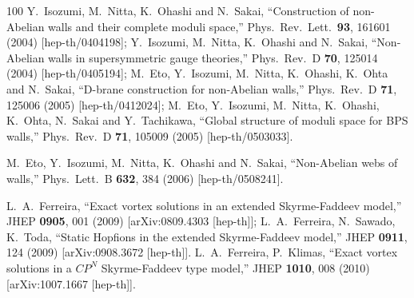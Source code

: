 \documentclass[aps,prd,preprint,
superscriptaddress]{revtex4}
\newcommand {\1}[1]{\frac{1}{#1}}
\newcommand {\2}[1]{\frac{i}{#1}}
\begin{document}
\begin{thebibliography}{100}
  Y.~Isozumi, M.~Nitta, K.~Ohashi and N.~Sakai,
  ``Construction of non-Abelian walls and their complete moduli space,''  
Phys.\ Rev.\ Lett.\  {\bf 93}, 161601 (2004)  [hep-th/0404198];  %
  Y.~Isozumi, M.~Nitta, K.~Ohashi and N.~Sakai,
  ``Non-Abelian walls in supersymmetric gauge theories,''  
Phys.\ Rev.\ D {\bf 70}, 125014 (2004)  [hep-th/0405194];  %
  M.~Eto, Y.~Isozumi, M.~Nitta, K.~Ohashi, K.~Ohta and N.~Sakai,
  ``D-brane construction for non-Abelian walls,''  
Phys.\ Rev.\ D {\bf 71}, 125006 (2005)  [hep-th/0412024];  %
  M.~Eto, Y.~Isozumi, M.~Nitta, K.~Ohashi, K.~Ohta, N.~Sakai and Y.~Tachikawa,
  ``Global structure of moduli space for BPS walls,''  Phys.\ Rev.\ D {\bf 71}, 105009 (2005)  [hep-th/0503033].  %

  M.~Eto, Y.~Isozumi, M.~Nitta, K.~Ohashi and N.~Sakai,
  ``Non-Abelian webs of walls,''  Phys.\ Lett.\ B {\bf 632}, 384 (2006)  [hep-th/0508241]. %

  L.~A.~Ferreira,
  ``Exact vortex solutions in an extended Skyrme-Faddeev model,''
  JHEP {\bf 0905}, 001 (2009) [arXiv:0809.4303 [hep-th]];
  L.~A.~Ferreira, N.~Sawado, K.~Toda,
  ``Static Hopfions in the extended Skyrme-Faddeev model,''
  JHEP {\bf 0911}, 124 (2009)
  [arXiv:0908.3672 [hep-th]].
  L.~A.~Ferreira, P.~Klimas,
  ``Exact vortex solutions in a $CP^N$ Skyrme-Faddeev type model,''
  JHEP {\bf 1010}, 008 (2010)
  [arXiv:1007.1667 [hep-th]].

\end{thebibliography}
\end{document}
